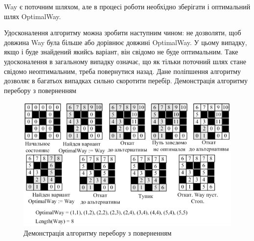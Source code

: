 Way є поточним шляхом, але в процесі роботи необхідно зберігати і оптимальний шлях OptimalWay.

Удосконалення алгоритму можна зробити наступним чином: не дозволяти, щоб довжина Way була більше або дорівнює довжині OptimalWay. У цьому випадку, якщо і буде знайдений якийсь варіант, він свідомо не буде оптимальним. Таке удосконалення в загальному випадку означає, що як тільки поточний шлях стане свідомо неоптимальним, треба повернутися назад. Дане поліпшення алгоритму дозволяє в багатьох випадках сильно скоротити перебір.
Демонстрація алгоритму перебору з поверненням

\begin{figure}
\caption{Демонстрація алгоритму перебору з поверненням}\label{pic:45.3}
\includegraphics[width=13cm]{pic/45_03.png}
\end{figure}

